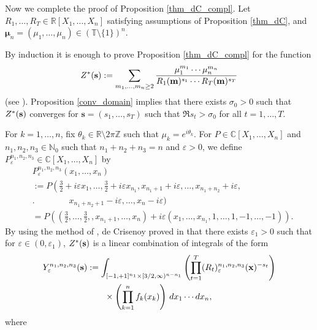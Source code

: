 \documentclass[a4paper,12pt]{article}
\theoremstyle{definition}
\numberwithin{equation}{section}
\def\N{{\mathbb N}}
\def\Z{{\mathbb Z}}
\def\R{{\mathbb R}}
\def\C{{\mathbb C}}
\def\s{{\bf s}}
\def\x{{\bf x}}
\newcommand{\dd}{d}
\newcommand{\ii}{i}
\newcommand{\phie}{e}
\def\eps{{\varepsilon}}
\begin{document}
Now we complete the proof of Proposition 
\ref{thm_dC_compl}.
Let $R_1,\ldots,R_T \in \mathbb{R} [X_1,\ldots,X_n]$ satisfying assumptions of Proposition \ref{thm_dC}, and $\boldsymbol{\mu}_n=(\mu_1,\ldots,\mu_{n})\in (\mathbb{T} \setminus \{ 1 \})^{n}$.

By induction it is enough to prove Proposition \ref{thm_dC_compl} for the function
$$Z^*(\s):=\sum_{m_1,\ldots,m_n \geq 2} \frac{\mu_1^{m_1}\cdots \mu_n^{m_n}}{R_1(\mathbf{m})^{s_1} \cdots R_T(\mathbf{m})^{s_T}}
$$
(see \cite[pp.~1390--1391]{dC}).
Proposition \ref{conv_domain} implies that there exists $\sigma_0>0$ such that $Z^*(\s)$
converges for $\mathbf{s}=(s_1,\ldots,s_T)$ such that $\Re s_t>\sigma_0$ for all $t=1,\ldots,T$.

For $k=1,\ldots, n$, fix $\theta_k \in \R\setminus 2\pi \Z$ such that $\mu_k =\phie^{\ii \theta_k}$.
For $P\in \C[X_1,\ldots, X_n]$ and $n_1,n_2,n_3\in \N_0$ such that $n_1+n_2+n_3=n$ and $\eps >0$, we define $P_\eps^{n_1, n_2, n_3} \in \C[X_1,\ldots, X_n]$ by
\begin{align*}
& P_\eps^{n_1, n_2, n_3}(x_1,\ldots,x_n)\\
& :=P\left(\frac{3}{2}+i\eps x_1,\ldots,\frac{3}{2}+i\eps x_{n_1},x_{n_1+1}+i\eps,\ldots,x_{n_1+n_2}+i\eps,\right.\\
&\biggl.\qquad\qquad x_{n_1+n_2+1}-i\eps,\ldots,x_{n}-i\eps\biggr)\\
&= P\left(\left(\frac{3}{2},\ldots,\frac{3}{2}, ,x_{n_1+1},\ldots, x_{n}\right)+i\eps\left(x_1,\ldots,x_{n_1},1,\ldots,1,-1,\ldots,-1\right)\right).
\end{align*}
By using the method of \cite{Esso97}, de Crisenoy proved in \cite[pp.~1390--1391]{dC} that there exists $\eps_1>0$ such that for $\eps \in (0,\eps_1)$, $Z^*(\s)$ is a linear combination of integrals of the form
\begin{align*}
Y_\eps^{n_1,n_2,n_3}(\s)
&:= \int_{ [-1,+1]^{n_1}\times [3/2,\infty)^{n-n_1}}\left(\prod_{t=1}^T 
(R_t)_\eps^{n_1,n_2,n_3}(\x)^{-s_t}\right) \\
& \qquad  \times \left(\prod_{k=1}^n f_k (x_k)\right) \, \dd x_1\cdots \dd x_n,
\end{align*}
where 
\end{document}
